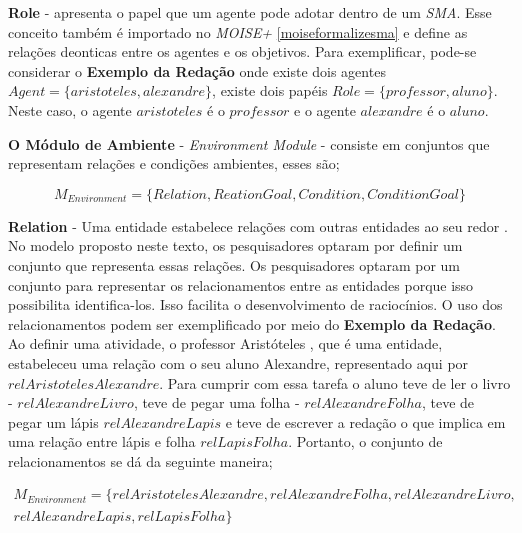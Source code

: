 \textbf{Role} - apresenta o papel que um agente pode adotar dentro de um \textit{SMA}. Esse conceito também é importado no \textit{MOISE+} 
\ref{moiseformalizesma} e define as relações deonticas entre os agentes e os objetivos. Para exemplificar, pode-se considerar o \textbf{Exemplo da Redação} onde existe dois agentes $Agent = \{ aristoteles, alexandre \}$, existe dois papéis $Role = \{ professor, aluno\}$. Neste caso, o agente $aristoteles$ é o $professor$ e o agente $alexandre$ é o $aluno$.

\textbf{O Módulo de Ambiente} - \textit{Environment Module} - consiste em conjuntos que representam relações e condições ambientes, esses são;

\begin{equation}
    M_{Environment} = \{ Relation, ReationGoal, Condition, ConditionGoal \}
\end{equation}

\textbf{Relation} - Uma entidade estabelece relações com outras entidades ao seu redor \cite{entity}. No modelo proposto neste texto, 
os pesquisadores optaram por definir um conjunto que representa essas relações. Os pesquisadores optaram por um conjunto para representar
os relacionamentos entre as entidades porque isso possibilita identifica-los. Isso facilita o desenvolvimento de raciocínios. O uso 
dos relacionamentos podem ser exemplificado por meio do \textbf{Exemplo da Redação}. Ao definir uma atividade, o professor Aristóteles
, que é uma entidade, estabeleceu uma relação com o seu aluno Alexandre, representado aqui por $relAristotelesAlexandre$. Para cumprir com essa tarefa o aluno teve de ler o livro - $relAlexandreLivro$, teve de pegar uma folha - $relAlexandreFolha$, teve de pegar um lápis $relAlexandreLapis$ e teve de escrever a redação o que implica em uma relação entre lápis e folha $relLapisFolha$. Portanto, o conjunto de relacionamentos se dá da seguinte maneira;

\begin{eqnarray}\label{Environment}\nonumber
    M_{Environment} = \{ relAristotelesAlexandre, relAlexandreFolha, relAlexandreLivro, \\ \nonumber
     relAlexandreLapis, relLapisFolha \}
\end{eqnarray}

